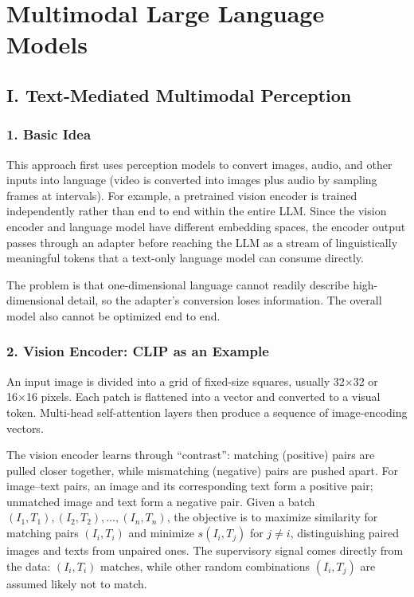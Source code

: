 \setcounter{section}{5}

\hypertarget{multimodal-large-language-models}{%
\section{Multimodal Large Language Models}\label{multimodal-large-language-models}}

\hypertarget{i.-text-mediated-multimodal-perception}{%
\subsection{I. Text-Mediated Multimodal Perception}\label{i.-text-mediated-multimodal-perception}}

\hypertarget{basic-idea}{%
\subsubsection{1. Basic Idea}\label{basic-idea}}

This approach first uses perception models to convert images, audio, and other inputs into language (video is converted into images plus audio by sampling frames at intervals). For example, a pretrained vision encoder is trained independently rather than end to end within the entire LLM. Since the vision encoder and language model have different embedding spaces, the encoder output passes through an adapter before reaching the LLM as a stream of linguistically meaningful tokens that a text-only language model can consume directly.

The problem is that one-dimensional language cannot readily describe high-dimensional detail, so the adapter's conversion loses information. The overall model also cannot be optimized end to end.

\hypertarget{vision-encoder-clip-as-an-example}{%
\subsubsection{2. Vision Encoder: CLIP as an Example}\label{vision-encoder-clip-as-an-example}}

An input image is divided into a grid of fixed-size squares, usually 32×32 or 16×16 pixels. Each patch is flattened into a vector and converted to a visual token. Multi-head self-attention layers then produce a sequence of image-encoding vectors.

The vision encoder learns through ``contrast'': matching (positive) pairs are pulled closer together, while mismatching (negative) pairs are pushed apart. For image--text pairs, an image and its corresponding text form a positive pair; unmatched image and text form a negative pair. Given a batch \((I_1,T_1),(I_2,T_2),\ldots,(I_n,T_n)\), the objective is to maximize similarity for matching pairs \((I_i,T_i)\) and minimize \(s(I_i,T_j)\) for \(j\ne i\), distinguishing paired images and texts from unpaired ones. The supervisory signal comes directly from the data: \((I_i,T_i)\) matches, while other random combinations \((I_i,T_j)\) are assumed likely not to match.

